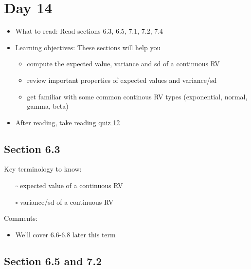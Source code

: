 \documentclass[
  letterpaper,
]{scrbook}
\providecommand{\tightlist}{%
  \setlength{\itemsep}{0pt}\setlength{\parskip}{0pt}}\usepackage{longtable,booktabs,array}
\begin{document}
\section*{Day 14}\label{day-14}


\begin{itemize}
\item
  What to read: Read sections 6.3, 6.5, 7.1, 7.2, 7.4
\item
  Learning objectives: These sections will help you

  \begin{itemize}
  \tightlist
  \item
    compute the expected value, variance and sd of a continuous RV
  \item
    review important properties of expected values and variance/sd
  \item
    get familiar with some common continous RV types (exponential,
    normal, gamma, beta)
  \end{itemize}
\item
  After reading, take reading
  \href{https://forms.gle/UEE5pFNSJ3weXMBQ6}{quiz 12}
\end{itemize}

\subsection*{Section 6.3}\label{section-6.3}

Key terminology to know:

\begin{itemize}
\tightlist
\item[$\square$]
  expected value of a continuous RV
\item[$\square$]
  variance/sd of a continuous RV
\end{itemize}

Comments:

\begin{itemize}
\tightlist
\item
  We'll cover 6.6-6.8 later this term
\end{itemize}

\subsection*{Section 6.5 and 7.2}\label{section-6.5-and-7.2}
\end{document}
